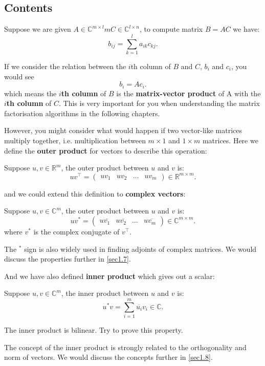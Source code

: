 \subsection*{Contents}
\begin{definition}
  Suppose we are given $A \in \mathbb{C}^{m \times l}m C \in \mathbb{C}^{l \times n}$, to compute matrix $B = AC$ we have:
  \[
    b_{ij} = \sum_{k = 1}^{l} a_{ik}c_{kj} 
  .\]  
\end{definition}
\begin{note}
  If we consider the relation between the \(i\)th column of \(B\) and \(C\), \(b_i\)  and \(c_i\), you would see
  \[
    b_i = Ac_i
  .\]
  which means the \textbf{\(i\)th column} of \(B\) is the \textbf{matrix-vector product} of A with the \textbf{\(i\)th column} of \(C\). This is very important for you when understanding the matrix factorisation algorithms in the following chapters. \checked
\end{note}
However, you might consider what would happen if two vector-like matrices multiply together, i.e. multiplication between \(m \times 1\) and \(1 \times m\) matrices. Here we define the \textbf{outer product} for vectors to describe this operation:
\begin{definition}
  Suppose \(u, v \in \mathbb{R}^{m}\), the outer product between \(u\) and \(v\) is:
  \[
    uv^{\top} = \begin{pmatrix} 
      uv_1 & uv_2 & \dots & uv_m 
    \end{pmatrix} \in \mathbb{R}^{m\times m}
  .\]
\end{definition}
and we could extend this definition to \textbf{complex vectors}:
\begin{definition}
  Suppose \(u, v \in \mathbb{C}^{m}\), the outer product between \(u\)  and \(v\)  is:
  \[
    uv^{*} = \begin{pmatrix} 
      u\overline{v_1} & u\overline{v_2} & \dots & u\overline{v_m}
    \end{pmatrix} \in \mathbb{C}^{m \times  m} 
  .\]
  where \(v^{*}\) is the complex conjugate of \(v^{\top}\).
\end{definition}     
The \(^{*}\) sign is also widely used in finding adjoints of complex matrices. We would discuss the properties further in \autoref{sec1.7}. \smallskip

\noindent And we have also defined \textbf{inner product} which gives out a scalar:
\begin{definition}
  Suppose \(u, v \in \mathbb{C}^{m}\), the inner product between \(u\)  and \(v\)  is:
  \[
    u^{*}v = \sum_{i=1}^{m} \overline{u_i}v_i \in \mathbb{C}
  .\] 
\end{definition}   
\begin{property}
  The inner product is bilinear. Try to prove this property.
\end{property}
The concept of the inner product is strongly related to the orthogonality and norm of vectors. We would discuss the concepts further in \autoref{sec1.8}. \checked
